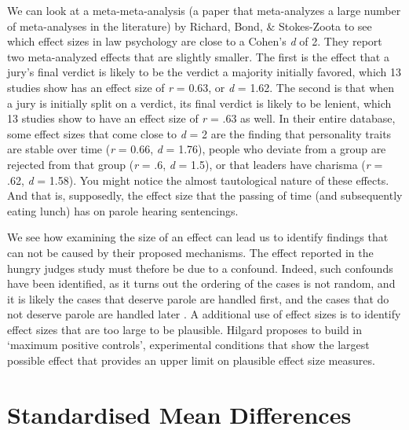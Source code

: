 \documentclass[
  oneside]{book}
\begin{document}
We can look at a meta-meta-analysis (a paper that meta-analyzes a large number of meta-analyses in the literature) by Richard, Bond, \& Stokes-Zoota \citeyearpar{richard_one_2003} to see which effect sizes in law psychology are close to a Cohen's \emph{d} of 2. They report two meta-analyzed effects that are slightly smaller. The first is the effect that a jury's final verdict is likely to be the verdict a majority initially favored, which 13 studies show has an effect size of \emph{r} = 0.63, or \emph{d} = 1.62. The second is that when a jury is initially split on a verdict, its final verdict is likely to be lenient, which 13 studies show to have an effect size of \emph{r} = .63 as well. In their entire database, some effect sizes that come close to \emph{d} = 2 are the finding that personality traits are stable over time (\emph{r} = 0.66, \emph{d} = 1.76), people who deviate from a group are rejected from that group (\emph{r} = .6, \emph{d} = 1.5), or that leaders have charisma (\emph{r} = .62, \emph{d} = 1.58). You might notice the almost tautological nature of these effects. And that is, supposedly, the effect size that the passing of time (and subsequently eating lunch) has on parole hearing sentencings.

We see how examining the size of an effect can lead us to identify findings that can not be caused by their proposed mechanisms. The effect reported in the hungry judges study must thefore be due to a confound. Indeed, such confounds have been identified, as it turns out the ordering of the cases is not random, and it is likely the cases that deserve parole are handled first, and the cases that do not deserve parole are handled later \citep{weinshall-margel_overlooked_2011, chatziathanasiou_beware_2022}. A additional use of effect sizes is to identify effect sizes that are too large to be plausible. Hilgard \citeyearpar{hilgard_maximal_2021} proposes to build in `maximum positive controls', experimental conditions that show the largest possible effect that provides an upper limit on plausible effect size measures.

\hypertarget{cohend}{%
\section{Standardised Mean Differences}\label{cohend}}
\end{document}
